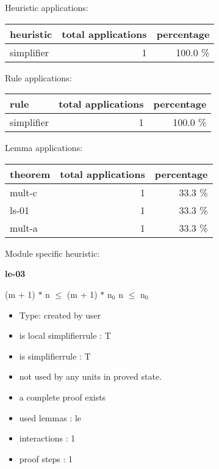 \documentclass[a4paper]{article}
\begin{document}
\medskip


Heuristic applications:

\begin{supertabular}{l|r|r}
heuristic	& total applications & percentage \\ \hline
simplifier & 1 & 100.0 \% \\

\end{supertabular}

Rule applications:

\begin{supertabular}{l|r|r}
rule	        & total applications & percentage \\ \hline
simplifier & 1 & 100.0 \% \\

\end{supertabular}

Lemma applications:

\begin{supertabular}{l|r|r}
theorem	        & total applications & percentage \\ \hline
mult-c & 1 & 33.3 \% \\
ls-01 & 1 & 33.3 \% \\
mult-a & 1 & 33.3 \% \\

\end{supertabular}

Module specific heuristic:

\pagebreak

{\LARGE\bf le-03}\label{lemma-le-03}

\medskip

 \Fol (m + 1) $*$ n $\le$ (m + 1) $*$ $\mbox{n}_{0}$ \Equiv n $\le$ $\mbox{n}_{0}$

\begin{itemize}

\item Type: created by user

\item is local simplifierrule : T
\item is simplifierrule : T
\item not used by any units in proved state.
\item       a complete proof exists
\item       used lemmas  : le
\item       interactions : 1
\item       proof steps  : 1
\end{itemize}
\end{document}
